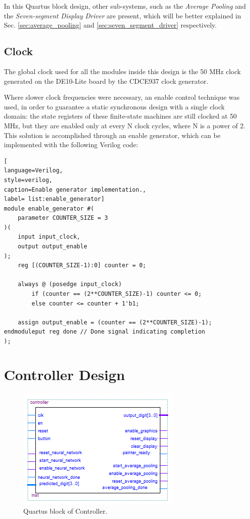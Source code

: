 \documentclass[11pt]{report}
\begin{document}
In this Quartus block design, other sub-systems, such as the \textit{Average Pooling} and the \textit{Seven-segment Display Driver} are present, which will be better explained in Sec. \ref{sec:average_pooling} and \ref{sec:seven_segment_driver} respectively.

\section{Clock}
The global clock used for all the modules inside this design is the 50 MHz clock generated on the DE10-Lite board by the CDCE937 clock generator.

Where slower clock frequencies were necessary, an enable control technique was used, in order to guarantee a static synchronous design with a single clock domain: the state registers of these finite-state machines are still clocked at 50 MHz, but they are enabled only at every N clock cycles, where N is a power of 2. This solution is accomplished through an enable generator, which can be implemented with the following Verilog code:

\begin{lstlisting}[
language=Verilog,
style=verilog,
caption=Enable generator implementation.,
label= list:enable_generator]
module enable_generator #(
    parameter COUNTER_SIZE = 3
)(
    input input_clock,
    output output_enable
);
    reg [(COUNTER_SIZE-1):0] counter = 0;
    
    always @ (posedge input_clock)
        if (counter == (2**COUNTER_SIZE)-1) counter <= 0;
        else counter <= counter + 1'b1;

    assign output_enable = (counter == (2**COUNTER_SIZE)-1);
endmoduleput reg done // Done signal indicating completion
);
\end{lstlisting}


\chapter{Controller Design} 

\begin{figure}[!h]
    \centering
    \includegraphics[width=0.6\linewidth]{images/controller/controller_quartus_block.png}
    \caption{Quartus block of Controller.}
    \label{fig:controller}
\end{figure}
\end{document}

